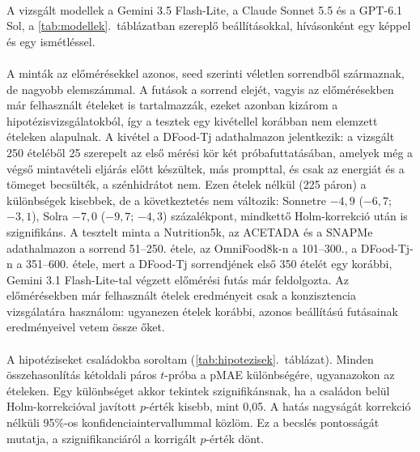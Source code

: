 \paragraph{}A vizsgált modellek a Gemini 3.5 Flash-Lite, 
a Claude Sonnet 5.5 és a GPT-6.1 Sol, a \ref{tab:modellek}.~táblázatban szereplő beállításokkal, 
hívásonként egy képpel és egy ismétléssel.

\paragraph{}A minták az előmérésekkel azonos, seed szerinti véletlen sorrendből származnak, de 
nagyobb elemszámmal. A futások a sorrend elejét, vagyis az előmérésekben már felhasznált ételeket 
is tartalmazzák, ezeket azonban kizárom a hipotézisvizsgálatokból, így a tesztek egy kivétellel
korábban nem elemzett ételeken alapulnak. A kivétel a DFood-Tj adathalmazon jelentkezik: a vizsgált 250 ételéből 25 szerepelt 
az első mérési kör két próbafuttatásában, amelyek még a végső mintavételi eljárás előtt készültek, 
más prompttal, és csak az energiát és a tömeget becsülték, a szénhidrátot nem. Ezen ételek nélkül 
(225 páron) a különbségek kisebbek, de a következtetés nem változik: Sonnetre $-4{,}9$ ($-6{,}7$; $-3{,}1$), 
Solra $-7{,}0$ ($-9{,}7$; $-4{,}3$) százalékpont, mindkettő Holm-korrekció után is szignifikáns. A tesztelt minta a Nutrition5k, az 
ACETADA és a SNAPMe adathalmazon a sorrend 51--250. étele, az OmniFood8k-n a 101--300., a DFood-Tj-n a 351--600. étele, mert a DFood-Tj sorrendjének első 350 ételét egy korábbi, 
Gemini 3.1 Flash-Lite-tal végzett előmérési futás már feldolgozta. Az előmérésekben 
már felhasznált ételek eredményeit csak a konzisztencia vizsgálatára használom: ugyanezen ételek 
korábbi, azonos beállítású futásainak eredményeivel vetem össze őket.

\paragraph{}A hipotéziseket családokba soroltam (\ref{tab:hipotezisek}.~táblázat). 
Minden összehasonlítás kétoldali páros $t$-próba a pMAE különbségére, ugyanazokon az ételeken. 
Egy különbséget akkor tekintek szignifikánsnak, ha a családon belül Holm-korrekcióval javított 
$p$-érték kisebb, mint 0,05. A hatás nagyságát korrekció nélküli 95\%-os konfidenciaintervallummal 
közlöm.
Ez a becslés pontosságát mutatja, a szignifikanciáról a korrigált $p$-érték dönt.


